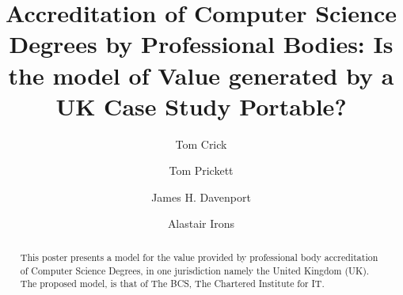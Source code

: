 \documentclass[sigconf]{acmart}
\begin{document}
\fancyhead{}


\title{Accreditation of Computer Science Degrees by Professional Bodies:  Is the model of Value generated by a UK Case Study Portable?}



\author{Tom Crick}

\author{Tom Prickett}

\author{James H. Davenport}


\begin{comment}


\author{Paul Hanna}
\affiliation{%
\institution{Ulster University}
\city{Belfast}
\country{UK}
}
\email{jrp.hanna@ulster.ac.uk}

\end{comment}

\author{Alastair Irons}


%
\renewcommand{\shortauthors}{Trovato and Tobin, et al.}

%
\begin{abstract}
	This poster presents a model for the value provided by professional body accreditation of Computer Science Degrees, in one jurisdiction namely the United Kingdom (UK). The proposed model, is that of The BCS, The Chartered Institute for IT. 
\end{abstract}
\end{document}
